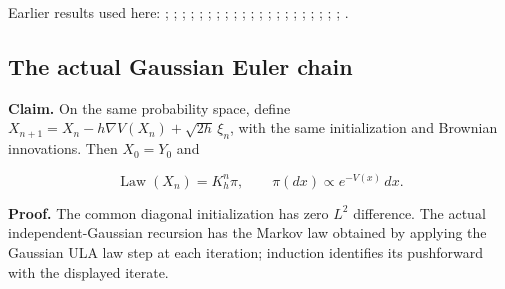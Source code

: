 \documentclass[11pt,a4paper]{report}
\begin{document}
Earlier results used here: \cite[Section~3.17.2]{LangevinLean2026ULASC}; \cite[Section~3.19.3]{LangevinLean2026ULASC}; \cite[Section~3.22.20]{LangevinLean2026ULASC}; \cite[Section~3.22.22]{LangevinLean2026ULASC}; \cite[Section~3.23.5]{LangevinLean2026ULASC}; \cite[Section~3.25.6]{LangevinLean2026ULASC}; \cite[Section~3.26.3]{LangevinLean2026ULASC}; \cite[Section~3.29.4]{LangevinLean2026ULASC}; \cite[Section~3.29.7]{LangevinLean2026ULASC}; \cite[Section~3.32.12]{LangevinLean2026ULASC}; \cite[Section~3.32.13]{LangevinLean2026ULASC}; \cite[Section~3.32.15]{LangevinLean2026ULASC}; \cite[Section~3.32.17]{LangevinLean2026ULASC}; \cite[Section~3.32.5]{LangevinLean2026ULASC}; \cite[Section~3.42.7]{LangevinLean2026ULASC}; \cite[Section~3.44.5]{LangevinLean2026ULASC}; \cite[Section~3.45.3]{LangevinLean2026ULASC}; \cite[Section~3.45.4]{LangevinLean2026ULASC}; \cite[Section~3.8.17]{LangevinLean2026ULASC}; \cite[Section~3.8.19]{LangevinLean2026ULASC}; \cite[Section~3.8.20]{LangevinLean2026ULASC}; \cite[Section~3.8.22]{LangevinLean2026ULASC}.
\subsection{\texorpdfstring{The actual Gaussian Euler chain}{The actual Gaussian Euler chain}}
\label{report-step-WassersteinMixing-ActualComparison-lean-3}


\textbf{Claim.} On the same probability space, define \(X_{n+1}=X_n-h\nabla V(X_n)+\sqrt{2h}\,\xi_n\), with the same initialization and Brownian innovations. Then \(X_0=Y_0\) and

\[\operatorname{Law}(X_n)=K_h^n\pi,\qquad \pi(dx)\propto e^{-V(x)}\,dx.\]

\textbf{Proof.} The common diagonal initialization has zero \(L^2\) difference. The actual independent-Gaussian recursion has the Markov law obtained by applying the Gaussian ULA law step at each iteration; induction identifies its pushforward with the displayed iterate.
\end{document}
